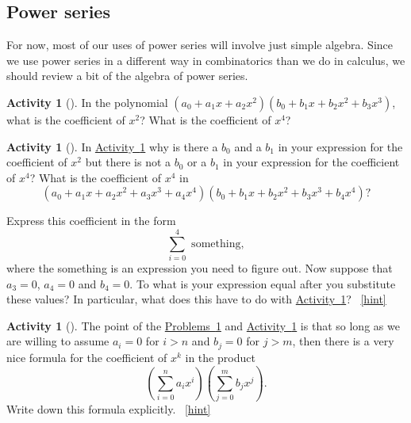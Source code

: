 \documentclass[10pt,]{book}
\theoremstyle{plain}
\theoremstyle{definition}
\theoremstyle{definition}
\theoremstyle{definition}
\newtheorem{activity}[project]{Activity}
\numberwithin{equation}{chapter}
\begin{document}
\subsection[{Power series}]{Power series}\label{subsection-22}
\hypertarget{p-866}{}%
For now, most of our uses of power series will involve just simple algebra. Since we use power series in a different way in combinatorics than we do in calculus, we should review a bit of the algebra of power series.%
\begin{activity}[]\label{coeffinproduct}
\hypertarget{p-867}{}%
In the polynomial \((a_0 +a_1x+a_2x^2)(b_0+b_1x+b_2x^2+b_3x^3)\), what is the coefficient of \(x^2\)? What is the coefficient of \(x^4\)?%
\end{activity}
\begin{activity}[]\label{coeffinproduct1}
\hypertarget{p-869}{}%
In \hyperref[coeffinproduct]{Activity~\ref{coeffinproduct}} why is there a \(b_0\) and a \(b_1\) in your expression for the coefficient of \(x^2\) but there is not a \(b_0\) or a \(b_1\) in your expression for the coefficient of \(x^4\)? What is the coefficient of \(x^4\) in%
\begin{equation*}
(a_0+a_1x+a_2x^2+a_3x^3+a_4x^4)(b_0+b_1x+b_2x^2
+b_3x^3+b_4x^4)?
\end{equation*}
%
\par
\hypertarget{p-870}{}%
Express this coefficient in the form%
\begin{equation*}
\sum_{i=0}^4 \mbox{ something} ,
\end{equation*}
where the something is an expression you need to figure out. Now suppose that \(a_3=0\), \(a_4=0\) and \(b_4=0\). To what is your expression equal after you substitute these values? In particular, what does this have to do with \hyperref[coeffinproduct]{Activity~\ref{coeffinproduct}}?%
~\hfill{\tiny\hyperlink{a-184}{[hint]}\hypertarget{q-184}{}}\end{activity}
\begin{activity}[]\label{coeffinproduct2}
\hypertarget{p-874}{}%
The point of the \hyperref[coeffinproduct]{Problems~\ref{coeffinproduct}} and \hyperref[coeffinproduct1]{Activity~\ref{coeffinproduct1}} is that so long as we are willing to assume \(a_i=0\) for \(i>n\) and \(b_j =0\) for \(j>m\), then there is a very nice formula for the coefficient of \(x^k\) in the product%
\begin{equation*}
\left(\sum_{i=0}^n a_ix^i\right)\left(\sum_{j=0}^m b_jx^j\right).
\end{equation*}
Write down this formula explicitly.%
~\hfill{\tiny\hyperlink{a-185}{[hint]}\hypertarget{q-185}{}}\end{activity}
\end{document}
